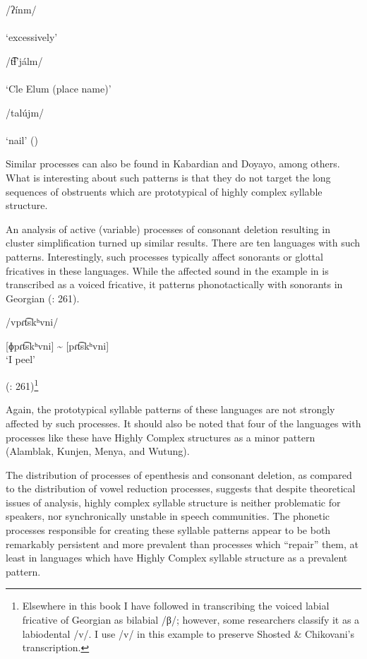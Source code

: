 \ea\label{ex:8.7}

\ea  /ʔínm/\\\relax
  [ʔínɨm]\\
  \glt ‘excessively’

\ex  /t͡ɬ’jálm/\\\relax
  [t͡ɬ’jálɨm]\\
  \glt ‘Cle Elum (place name)’

\ex  /talújm/\\\relax
  [talújɨm]\\
  \glt ‘nail’
\z
(\citealt[28]{HargusBeavert2006})
\z

Similar processes can also be found in Kabardian and Doyayo, among others. What is interesting about such patterns is that they do not target the long sequences of obstruents which are prototypical of highly complex syllable structure.

  An analysis of active (variable) processes of consonant deletion resulting in cluster simplification turned up similar results. There are ten languages with such patterns. Interestingly, such processes typically affect sonorants or glottal fricatives in these languages. While the affected sound in the example in  is transcribed as a voiced fricative, it patterns phonotactically with sonorants in Georgian (\citealt{ShostedChikovani2006}: 261).

\ea\label{ex:8.8}

/vpɾt͡skʰvni/

[ɸpɾt͡skʰvni] {\textasciitilde} [pɾt͡skʰvni]\\
\glt ‘I peel’

(\citealt{ShostedChikovani2006}: 261)\footnote{{Elsewhere in this book I have followed \citet{Aronson1991} in transcribing the voiced labial fricative of Georgian as bilabial /β/; however, some researchers classify it as a labiodental /v/. I use /v/ in this example to preserve Shosted \& Chikovani’s transcription.}}
\z

Again, the prototypical syllable patterns of these languages are not strongly affected by such processes. It should also be noted that four of the languages with processes like these have Highly Complex structures as a minor pattern (Alamblak, Kunjen, Menya, and Wutung).

  The distribution of processes of epenthesis and consonant deletion, as compared to the distribution of vowel reduction processes, suggests that despite theoretical issues of analysis, highly complex syllable structure is neither problematic for speakers, nor synchronically unstable in speech communities. The phonetic processes responsible for creating these syllable patterns appear to be both remarkably persistent and more prevalent than processes which ``repair'' them, at least in languages which have Highly Complex syllable structure as a prevalent pattern.

